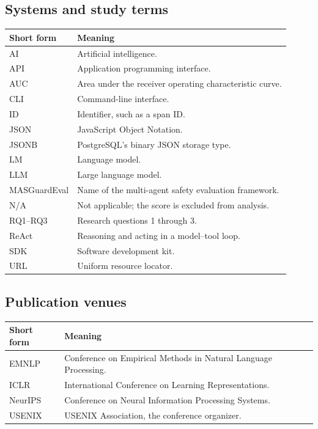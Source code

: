 \subsection*{Systems and study terms}
\begin{tabular}{@{}p{.95in}p{2.02in}@{}}
\toprule
Short form & Meaning \\
\midrule
AI & Artificial intelligence. \\
API & Application programming interface. \\
AUC & Area under the receiver operating characteristic curve. \\
CLI & Command-line interface. \\
ID & Identifier, such as a span ID. \\
JSON & JavaScript Object Notation. \\
JSONB & PostgreSQL's binary JSON storage type. \\
LM & Language model. \\
LLM & Large language model. \\
MASGuardEval & Name of the multi-agent safety evaluation framework. \\
N/A & Not applicable; the score is excluded from analysis. \\
RQ1--RQ3 & Research questions 1 through 3. \\
ReAct & Reasoning and acting in a model--tool loop. \\
SDK & Software development kit. \\
URL & Uniform resource locator. \\
\bottomrule
\end{tabular}

\subsection*{Publication venues}
\begin{tabular}{@{}p{.53in}p{2.44in}@{}}
\toprule
Short form & Meaning \\
\midrule
EMNLP & Conference on Empirical Methods in Natural Language Processing. \\
ICLR & International Conference on Learning Representations. \\
NeurIPS & Conference on Neural Information Processing Systems. \\
USENIX & USENIX Association, the conference organizer. \\
\bottomrule
\end{tabular}

